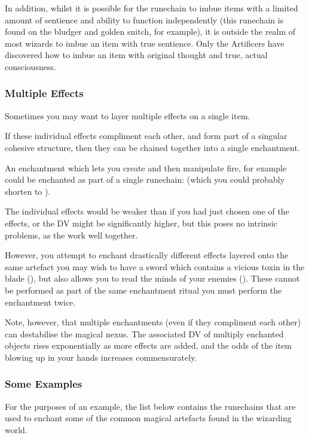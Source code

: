 {In addition, whilst it is possible for the runechain \rune{\aeternum\cingo\sensus} to imbue items with a limited amount of sentience and ability to function independently (this runechain is found on the bludger and golden snitch, for example), it is outside the realm of most wizards to imbue an item with true sentience. Only the Artificers have discovered how to imbue an item with original thought and true, actual consciousness. 

\subsubsection{Multiple Effects}

Sometimes you may want to layer multiple effects on a single item. 

If these individual effects compliment each other, and form part of a singular cohesive structure, then they can be chained together into a single enchantment. 

An enchantment which lets you create and then manipulate fire, for example could be enchanted as part of a single runechain: \rune{\lentus\genero\ignis\lentus\imperum\ignis} (which you could probably shorten to \rune{\lentus\genero\imperum\ignis}). 

The individual effects would be weaker than if you had just chosen one of the effects, or the DV might be significantly higher, but this poses no intrinsic problems, as the  work well together. 

However, you attempt to enchant drastically different effects layered onto the same artefact \minus{} you may wish to have a sword which contains a vicious toxin in the blade (\rune{\velox\perdero\morbus}), but also allows you to read the minds of your enemies (\rune{\aeternum\discite\sensus}). These cannot be performed as part of the same enchantment ritual \minus{} you must perform the enchantment twice. 

Note, however, that multiple enchantments (even if they compliment each other) can destabilise the magical nexus. The associated DV of multiply enchanted objects rises exponentially as more effects are added, and the odds of the item blowing up in your hands increases commensurately.  

\subsubsection{Some Examples}

For the purposes of an example, the list below contains the runechains that are used to enchant some of the common magical artefacts found in the wizarding world. 


}
